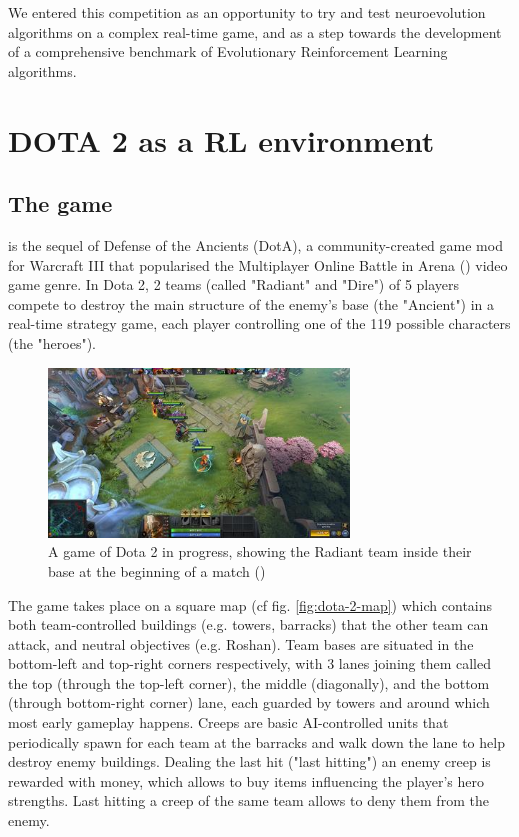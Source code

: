 We entered this competition as an opportunity to try and test neuroevolution algorithms on a complex real-time game, and as a step towards the development of a comprehensive benchmark of Evolutionary Reinforcement Learning algorithms.

\section{DOTA 2 as a RL environment}
\subsection{The game}

\href{https://en.wikipedia.org/wiki/Dota_2}{\color{blue}{Dota 2}} is the sequel of Defense of the Ancients (DotA), a community-created game mod for Warcraft III that popularised the Multiplayer Online Battle in Arena (\href{https://en.wikipedia.org/wiki/Multiplayer_online_battle_arena}{\color{blue}{MOBA}}) video game genre. In Dota 2, 2 teams (called "Radiant" and "Dire") of 5 players compete to destroy the main structure of the enemy's base (the "Ancient") in a real-time strategy game, each player controlling one of the 119 possible characters (the "heroes").

\begin{figure}[H]
 \centering
 \captionsetup{justification=centering, margin=0.5cm}
 \includegraphics[width=8cm]{images/Dota_2_Gameplay_Aug_2017.jpg}
\caption{A game of Dota 2 in progress, showing the Radiant team inside their base at the beginning of a match (\href{https://en.wikipedia.org/wiki/Dota_2}{\color{blue}{Source}})}
 \label{fig:dota-2-game}
\end{figure}

The game takes place on a square map (cf fig. \ref{fig:dota-2-map}) which contains both team-controlled buildings (e.g. towers, barracks) that the other team can attack, and neutral objectives (e.g. Roshan). Team bases are situated in the bottom-left and top-right corners respectively, with 3 lanes joining them called the top (through the top-left corner), the middle (diagonally), and the bottom (through bottom-right corner) lane, each guarded by towers and around which most early gameplay happens. Creeps are basic AI-controlled units that periodically spawn for each team at the barracks and walk down the lane to help destroy enemy buildings. Dealing the last hit ("last hitting") an enemy creep is rewarded with money, which allows to buy items influencing the player's hero strengths. Last hitting a creep of the same team allows to deny them from the enemy. 

